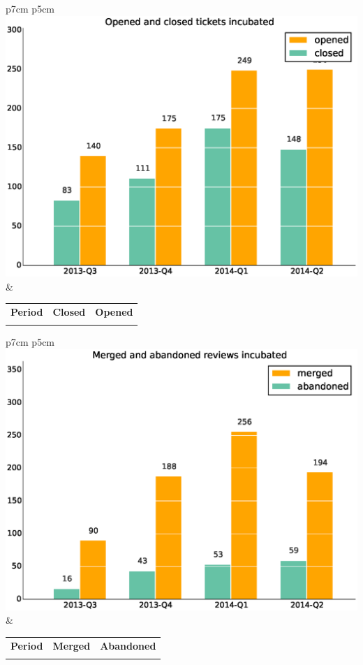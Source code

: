 \documentclass[a4wide,11pt]{report}
\begin{document}
\begin{tabular}{p{7cm} p{5cm}}
    \vspace{0pt} 
    \includegraphics[scale=.35]{figs/closedincubated.eps}
    & 
    \vspace{0pt}
    \begin{tabular}{l|r|r|}%
\bfseries Period & \bfseries Closed & \bfseries Opened
    \csvreader[head to column names]{data/closedincubated.csv}{}%
    {\\ & \closed & \opened}
    \end{tabular}
\end{tabular}

\begin{tabular}{p{7cm} p{5cm}}
    \vspace{0pt} 
    \includegraphics[scale=.35]{figs/submitted_reviewsincubated.eps}
    & 
    \vspace{0pt}
    \begin{tabular}{l|r|r|}%
    \bfseries Period & \bfseries Merged & \bfseries Abandoned %
    \csvreader[head to column names]{data/submitted_reviewsincubated.csv}{}%
    {\\ & \merged & \abandoned}
    \end{tabular}
\end{tabular}
\end{document}
